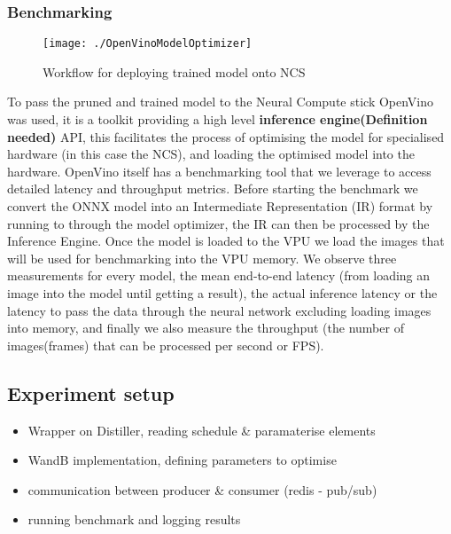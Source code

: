 \documentclass[../Dissertation.tex]{subfiles}
\begin{document}
\subsubsection{Benchmarking}

\begin{figure}[H]
	\centering
	\texttt{[image: ./OpenVinoModelOptimizer]}
	\caption{Workflow for deploying trained model onto NCS~\autocite{ModelOptimizerDeveloper}}
	\label{fig:OpenVinoWorkflow}
\end{figure}


To pass the pruned and trained model to the Neural Compute stick OpenVino was used, it is a toolkit providing a high level \textbf{inference engine(Definition needed)} API, this facilitates the process of optimising the model for specialised hardware (in this case the NCS), and loading the optimised model into the hardware. 
OpenVino itself has a benchmarking tool that we leverage to access detailed latency and throughput metrics. 
Before starting the benchmark we convert the ONNX model into an Intermediate Representation (IR) format by running to through the model optimizer, the IR can then be processed by the Inference Engine.
Once the model is loaded to the VPU we load the images that will be used for benchmarking into the VPU memory.
We observe three measurements for every model, the mean end-to-end latency (from loading an image into the model until getting a result), the actual inference latency or the latency to pass the data through the neural network excluding loading images into memory, and finally we also measure the throughput (the number of images(frames) that can be processed per second or FPS).

\subsection{Experiment setup}
\begin{itemize}
    \item Wrapper on Distiller, reading schedule \& paramaterise elements
    \item WandB implementation, defining parameters to optimise
    \item communication between producer \& consumer (redis - pub/sub)
    \item running benchmark and logging results
\end{itemize}
\end{document}
